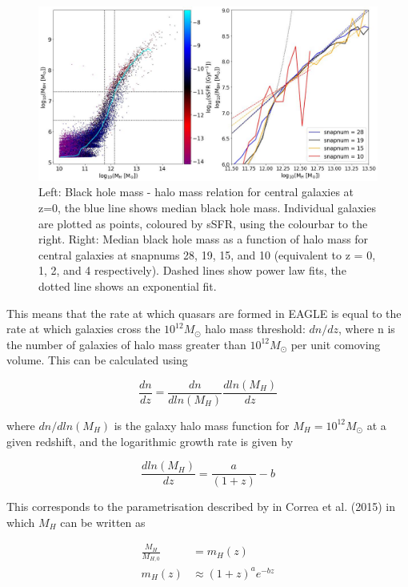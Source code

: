 \documentclass[12pt, twocolumn]{revtex4}    %
\begin{document}
\begin{figure}[H]
\centering
\includegraphics[width=17cm]{Plot_3.jpeg}
\caption{Left: Black hole mass - halo mass relation for central galaxies at z=0, the blue line shows median black hole mass. Individual galaxies are plotted as points, coloured by sSFR, using the colourbar to the right. Right: Median black hole mass as a function of halo mass for central galaxies at snapnums 28, 19, 15, and 10 (equivalent to z = 0, 1, 2, and 4 respectively). Dashed lines show power law fits, the dotted line shows an exponential fit.}
\label{fig:4}
\end{figure}
\clearpage
\twocolumngrid


This means that the rate at which quasars are formed in EAGLE is equal to the rate at which galaxies cross the $10^{12}M_\odot$ halo mass threshold: $dn/dz$, where n is the number of galaxies of halo mass greater than $10^{12}M_\odot$ per unit comoving volume. This can be calculated using \cite{Correa}

\begin{equation}
    \frac{dn}{dz}=\frac{dn}{dln(M_H)}\frac{dln(M_H)}{dz}
\end{equation}

\noindent where $dn/dln(M_H)$ is the galaxy halo mass function for $M_H=10^{12}M_\odot$ at a given redshift, and the logarithmic growth rate is given by

\begin{equation}
    \frac{dln(M_H)}{dz}=\frac{a}{(1+z)}-b
\end{equation}

\noindent This corresponds to the parametrisation described by in Correa et al. (2015) in which $M_H$ can be written as

\begin{align}
    \frac{M_H}{M_{H,0}}&=m_H(z) \nonumber \\
    m_H(z)&\approx(1+z)^ae^{-bz}
\end{align}
\end{document}
